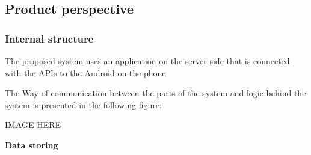 \subsection{Product perspective}

\subsubsection{Internal structure}
\hspace{\parindent}The proposed system uses an application on the server side that is connected with the APIs to the Android on the phone. 

The Way of communication between the parts of the system and logic behind the system is presented in the following figure:

IMAGE HERE

\textbf{Data storing}\\

